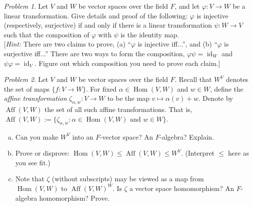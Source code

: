 \documentclass[11pt]{paper}
\theoremstyle{remark}
\newtheorem{problem}{Problem}
\newcommand{\<}{\ensuremath{\langle}}
\renewcommand{\>}{\ensuremath{\rangle}}
\newcommand\Hom{\ensuremath{\operatorname{Hom}}}
\newcommand{\Aff}{\ensuremath{\operatorname{Aff}}}
\newcommand{\id}{\ensuremath{\operatorname{id}}}
\renewcommand{\phi}{\ensuremath{\varphi}}
\renewcommand{\leq}{\ensuremath{\leqslant}}
\begin{document}
\probskip

\begin{problem}
Let $V$ and $W$ be vector spaces over the field $F$, and let 
$\phi : V \rightarrow W$ be a linear transformation. Give details and proof of
the following: $\phi$ is injective (respectively, surjective) if and only if 
there is a linear transformation $\psi: W \rightarrow V$ such that the
composition of $\phi$ with $\psi$ is the identity map.\\[4pt]
[{\it Hint:} There are two claims to prove, (a) ``$\phi$
  is injective iff...'', and (b) ``$\phi$ is surjective
  iff...'' There are two ways to form the composition, 
$\phi \psi = \id_W$ and $\psi \phi = \id_V$. Figure out which composition
you need to prove each claim.]
\end{problem}

\probskip

\begin{problem} Let $V$ and $W$ be vector spaces over the field $F$.
Recall that $W^V$ denotes the set of maps $\{f : V \rightarrow W\}$.
For fixed $\alpha \in \Hom(V,W)$ and $w \in W$, define the 
\emph{affine transformation} $\zeta_{\alpha, w}: V \rightarrow W$ to be the map 
$v \mapsto \alpha(v) + w$.
Denote by $\Aff (V, W)$ the set of all such affine transformations.  That is,
$\Aff (V, W) := \{\zeta_{\alpha, w} : \alpha \in \Hom(V,W) \text{ and } w \in W\}$.
\begin{enumerate}[(a)]
\item Can you make $W^V$ into an $F$-vector space? An $F$-algebra? Explain.
\item Prove or disprove: $\Hom(V,W) \leq \Aff (V, W) \leq W^{V}$. 
(Interpret $\leq$ here as you see fit.)
\item Note that $\zeta$ (without subscripts) may be viewed as a map from 
$\Hom(V,W)$ to $\Aff(V,W)^W$. Is $\zeta$ a vector space
  homomorphism?  An $F$-algebra homomorphism? Prove.
\end{enumerate}

\end{problem}

\probskip
\end{document}
